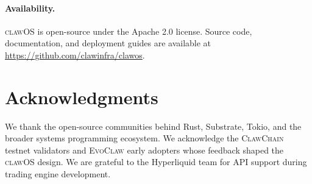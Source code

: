 \documentclass{article}
\newcommand{\clawos}{\textsc{clawOS}}
\newcommand{\evoclaw}{\textsc{EvoClaw}}
\newcommand{\clawchain}{\textsc{ClawChain}}
\begin{document}
\paragraph{Availability.} \clawos{} is open-source under the Apache 2.0 license. Source code, documentation, and deployment guides are available at \url{https://github.com/clawinfra/clawos}.

%
%

\section*{Acknowledgments}

We thank the open-source communities behind Rust, Substrate, Tokio, and the broader systems programming ecosystem. We acknowledge the \clawchain{} testnet validators and \evoclaw{} early adopters whose feedback shaped the \clawos{} design. We are grateful to the Hyperliquid team for API support during trading engine development.

%
%


\end{document}
